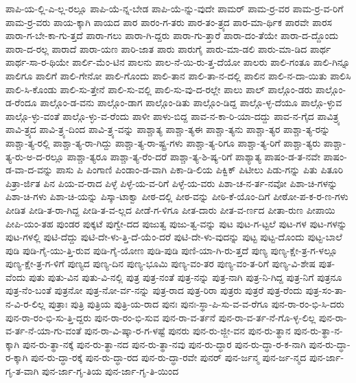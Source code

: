 {ಪಾಪಿ-ಯ-ಲ್ಲಿ-ಎ-ಲ್ಲ-ರಲ್ಲೂ
ಪಾಪಿ-ಯೆ-ನ್ನ-ಬೇಡ
ಪಾಪಿ-ಯೆ-ನ್ನು-ವುದೇ
ಪಾಮರ್
ಪಾಮ-ರ್ರ-ವರ
ಪಾಮ-ರ್ರ-ವ-ರಿಗೆ
ಪಾಮ-ರ್ರ-ವರು
ಪಾಯ-ಕ್ಕಾಗಿ
ಪಾಯದ
ಪಾರ
ಪಾರಂ-ಗ-ತರು
ಪಾರ-ತಂ-ತ್ರ್ಯದ
ಪಾರ-ಮಾ-ರ್ಥಿಕ
ಪಾರವೇ
ಪಾರಸ
ಪಾರಾ-ಗ-ಬೇ-ಕಾ-ಗು-ತ್ತದೆ
ಪಾರಾ-ಗಲು
ಪಾರಾ-ಗಿ-ದ್ದರು
ಪಾರಾ-ಗು-ತ್ತಾರೆ
ಪಾರಾ-ದಂ-ತೆಯೇ
ಪಾರಾ-ದ-ದ್ದೊಂದು
ಪಾರಾ-ದ-ರಲ್ಲ
ಪಾರಾದೆ
ಪಾರಾ-ಯಣ
ಪಾರಿ-ಜಾತ
ಪಾರು
ಪಾರುಗೈ
ಪಾರು-ಮಾ-ಡಲಿ
ಪಾರು-ಮಾ-ಡಿದ
ಪಾರ್ಥ
ಪಾರ್ಥ-ಸಾ-ರ-ಥಿಯೇ
ಪಾರ್ಲಿ-ಮೆಂ-ಟಿನ
ಪಾಲನು
ಪಾಲ-ನೆ-ಯಿ-ರು-ತ್ತ-ದೆಯೋ
ಪಾಲರು
ಪಾಲಿ-ಗಂತೂ
ಪಾಲಿ-ಗಿನ್ನೂ
ಪಾಲಿಗೂ
ಪಾಲಿಗೆ
ಪಾಲಿ-ಗೇನೋ
ಪಾಲಿ-ಗೊಂದು
ಪಾಲಿ-ತಾನ
ಪಾಲಿ-ತಾ-ನ-ದಲ್ಲಿ
ಪಾಲಿನ
ಪಾಲಿ-ನ-ದಾ-ಯಿತು
ಪಾಲಿಸಿ
ಪಾಲಿ-ಸಿ-ಕೊಂಡು
ಪಾಲಿ-ಸು-ತ್ತೇನೆ
ಪಾಲಿ-ಸು-ವಲ್ಲಿ
ಪಾಲಿ-ಸು-ವು-ದ-ರಲ್ಲೇ
ಪಾಲು
ಪಾಲ್
ಪಾಲ್ಗೊಂ-ಡರು
ಪಾಲ್ಗೊಂ-ಡ-ರೆಂದೂ
ಪಾಲ್ಗೊಂ-ಡ-ವನು
ಪಾಲ್ಗೊಂ-ಡಾಗ
ಪಾಲ್ಗೊಂ-ಡಿತು
ಪಾಲ್ಗೊಂ-ಡಿದ್ದ
ಪಾಲ್ಗೊ-ಳ್ಳ-ದೆಯೂ
ಪಾಲ್ಗೊ-ಳ್ಳುವ
ಪಾಲ್ಗೊ-ಳ್ಳು-ವಂತೆ
ಪಾಲ್ಗೊ-ಳ್ಳು-ವ-ರೆಂದು
ಪಾಳೀ
ಪಾಳು-ಬಿದ್ದ
ಪಾವ-ನ-ಕಾ-ರಿ-ಯಾ-ದದ್ದು
ಪಾವ-ನ-ಗೈದ
ಪಾವಿತ್ರ್ಯ
ಪಾವಿ-ತ್ರ್ಯದ
ಪಾವಿ-ತ್ರ್ಯ-ದಿಂದ
ಪಾವಿ-ತ್ರ್ಯ-ವನ್ನು
ಪಾಶ್ಚಾತ್ಯ
ಪಾಶ್ಚಾ-ತ್ಯಈ
ಪಾಶ್ಚಾ-ತ್ಯನು
ಪಾಶ್ಚಾ-ತ್ಯರ
ಪಾಶ್ಚಾ-ತ್ಯ-ರನ್ನು
ಪಾಶ್ಚಾ-ತ್ಯ-ರಲ್ಲಿ
ಪಾಶ್ಚಾ-ತ್ಯ-ರಾ-ಗಿದ್ದು
ಪಾಶ್ಚಾ-ತ್ಯ-ರಾ-ಷ್ಟ್ರ-ಗಳು
ಪಾಶ್ಚಾ-ತ್ಯ-ರಿಗೂ
ಪಾಶ್ಚಾ-ತ್ಯ-ರಿಗೆ
ಪಾಶ್ಚಾ-ತ್ಯರು
ಪಾಶ್ಚಾ-ತ್ಯ-ರು-ಅ-ದ-ರಲ್ಲೂ
ಪಾಶ್ಚಾ-ತ್ಯರೂ
ಪಾಶ್ಚಾ-ತ್ಯ-ರೆಂ-ದರೆ
ಪಾಶ್ಚಾ-ತ್ಯ-ಶಿ-ಷ್ಯ-ರಿಗೆ
ಪಾಶ್ಯಾತ್ಯ
ಪಾಷಂ-ಡ-ತ-ನವೇ
ಪಾಷಂ-ಡ-ವಾ-ದ-ವನ್ನು
ಪಾಸು
ಪಿ
ಪಿಂಗಾಣಿ
ಪಿಂಡಾಂ-ಡ-ವಾಗಿ
ಪಿಕಾ-ಡಿ-ಲಿಯ
ಪಿಕ್ವಿಕ್
ಪಿಟೀಲು
ಪಿಡು-ಗನ್ನು
ಪಿತು
ಪಿತೂರಿ
ಪಿತ್ರಾ-ರ್ಜಿತ
ಪಿನ
ಪಿಯ-ವ-ರಾದ
ಪಿಳ್ಳೆ
ಪಿಳ್ಳೆ-ಯ-ವ-ರಿಗೆ
ಪಿಳ್ಳೆ-ಯ-ವರು
ಪಿಶಾ-ಚ-ನ-ರ್ತ-ನವೋ
ಪಿಶಾ-ಚಿ-ಗಳನ್ನು
ಪಿಶಾ-ಚಿ-ಗಳು
ಪಿಶಾ-ಚಿ-ಯನ್ನು
ಪಿಸ್ಕಾ-ಟಾಕ್ವಾ
ಪೀಠ-ದಲ್ಲಿ
ಪೀಠ-ವನ್ನು
ಪೀಠಿ-ಕೆ-ಯೊಂ-ದಿಗೆ
ಪೀಠೋ-ಪ-ಕ-ರ-ಣ-ಗಳು
ಪೀಡಿತ
ಪೀಡಿ-ತ-ರಾ-ಗಿದ್ದ
ಪೀಡಿ-ತ-ವ-ಲ್ಲದ
ಪೀಡೆ-ಗ-ಳಿಗೂ
ಪೀತ-ದಾರು
ಪೀತ-ವ-ರ್ಣದ
ಪೀತಾ-ರುಣ
ಪೀಪಾಯಿ
ಪೀಪಿ-ಯಂ-ತಹ
ಪುಂಡರ
ಪುಕ್ಕಟೆ
ಪುಗ್ವೇ-ದದ
ಪುಜುತ್ವ
ಪುಜು-ತ್ವ-ವನ್ನು
ಪುಟ
ಪುಟ-ಗ-ಟ್ಟಲೆ
ಪುಟ-ಗಳ
ಪುಟ-ಗಳನ್ನು
ಪುಟ-ಗಳಲ್ಲಿ
ಪುಟಿ-ದೆದ್ದು
ಪುಟಿ-ದೇ-ಳು-ತ್ತಿ-ದೆ-ಯೆಂ-ದರೆ
ಪುಟಿ-ದೇ-ಳು-ವುದನ್ನು
ಪುಟ್ಟ
ಪುಟ್ಟ-ದೊಂದು
ಪುಟ್ಟ-ಬಾಲೆ
ಪುಡಿ
ಪುಡಿ-ಗೈ-ಯು-ತ್ತಿ-ರುವ
ಪುಡಿ-ಗೈ-ಯೋಣ
ಪುಡಿ-ಪುಡಿ
ಪುಣಿ-ಯಾ-ಗಿ-ರು-ತ್ತದೆ
ಪುಣ್ಯ
ಪುಣ್ಯ-ಕ್ಷೇ-ತ್ರ-ಗ-ಳಲ್ಲೂ
ಪುಣ್ಯ-ಕ್ಷೇ-ತ್ರ-ಗ-ಳಿಗೆ
ಪುಣ್ಯದ
ಪುಣ್ಯ-ದಿನ
ಪುಣ್ಯ-ಭೂಮಿ
ಪುಣ್ಯ-ವಂ-ತರ
ಪುಣ್ಯ-ವಂ-ತ-ರಿಗೆ
ಪುಣ್ಯ-ವಿ-ಶೇಷ
ಪುತ-ವೆಂದು
ಪುತು
ಪುತು-ವಿನ
ಪುತು-ವಿ-ನಲ್ಲಿ
ಪುತ್ರ
ಪುತ್ರ-ನಂತೆ
ಪುತ್ರ-ನನ್ನು
ಪುತ್ರ-ನಾಗಿ
ಪುತ್ರ-ನಿ-ಗಿದ್ದ
ಪುತ್ರ-ನಿಗೆ
ಪುತ್ರನೂ
ಪುತ್ರ-ನೆಂ-ಬಂತೆ
ಪುತ್ರನೋ
ಪುತ್ರ-ನೋ-ರ್ವ-ನನ್ನು
ಪುತ್ರ-ರಾದ
ಪುತ್ರ-ರಿರಾ
ಪುತ್ರರು
ಪುತ್ರರೆ
ಪುತ್ರ-ರೆಂದು
ಪುತ್ರ-ಸಂ-ತಾ-ನ-ವಿ-ರ-ಲಿಲ್ಲ
ಪುತ್ರಾಃ
ಪುತ್ರಿ
ಪುತ್ರಿಯ
ಪುತ್ರಿ-ಯ-ರಾದ
ಪುನಃ
ಪುನಃ-ಸ್ಥಾ-ಪಿ-ಸು-ವ-ವ-ರೆಗೂ
ಪುನ-ರಾ-ರಂ-ಭಿ-ಸಿ-ದರು
ಪುನ-ರಾ-ರಂ-ಭಿ-ಸು-ತ್ತಿ-ದ್ದರು
ಪುನ-ರಾ-ರಂ-ಭಿ-ಸುವ
ಪುನ-ರಾ-ವ-ರ್ತನೆ
ಪುನ-ರಾ-ವ-ರ್ತ-ನೆ-ಗೊ-ಳ್ಳ-ಲಿಲ್ಲ
ಪುನ-ರಾ-ವ-ರ್ತ-ನೆ-ಯಾ-ಗು-ವಂತೆ
ಪುನ-ರಾ-ವಿ-ಷ್ಕಾ-ರ-ಗ-ಳಷ್ಟೆ
ಪುನರು
ಪುನ-ರು-ಜ್ಜೀ-ವನ
ಪುನ-ರು-ತ್ಥಾನ
ಪುನ-ರು-ತ್ಥಾ-ನ-ಕ್ಕಾಗಿ
ಪುನ-ರು-ತ್ಥಾ-ನಕ್ಕೆ
ಪುನ-ರು-ತ್ಥಾ-ನದ
ಪುನ-ರು-ತ್ಥಾ-ನವು
ಪುನ-ರು-ದ್ಧಾರ
ಪುನ-ರು-ದ್ಧಾ-ರ-ಕ-ನಾಗಿ
ಪುನ-ರು-ದ್ಧಾ-ರ-ಕ್ಕಾಗಿ
ಪುನ-ರು-ದ್ಧಾ-ರಕ್ಕೆ
ಪುನ-ರು-ದ್ಧಾ-ರದ
ಪುನ-ರು-ದ್ಧಾ-ರವೇ
ಪುನರ್
ಪುನ-ರ್ಜನ್ಮ
ಪುನ-ರ್ಜ-ನ್ಮದ
ಪುನ-ರ್ಜಾ-ಗೃ-ತ-ವಾಗಿ
ಪುನ-ರ್ಜಾ-ಗೃ-ತಿಯ
ಪುನ-ರ್ಜಾ-ಗೃ-ತಿ-ಯಿಂದ
}
